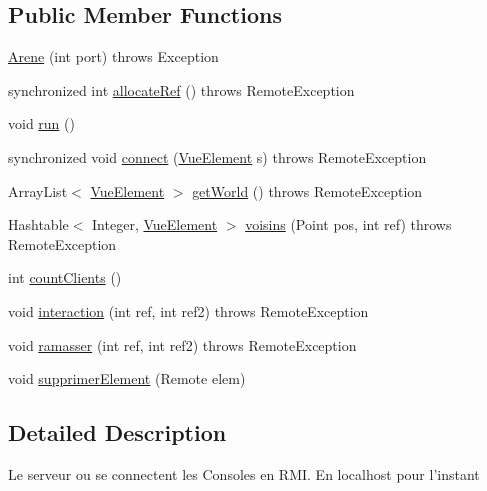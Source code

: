 \subsection*{Public Member Functions}
\begin{DoxyCompactItemize}
\item 
\hyperlink{classserveur_1_1_arene_a5431d21bfdc858dbe31c6ec6b046aaca}{Arene} (int port)  throws Exception 
\item 
synchronized int \hyperlink{classserveur_1_1_arene_a88151079f2665d1973168e0cb266e3c7}{allocate\-Ref} ()  throws Remote\-Exception 
\item 
void \hyperlink{classserveur_1_1_arene_af37bb33255b051fa9236a62507eaf0ab}{run} ()
\item 
synchronized void \hyperlink{classserveur_1_1_arene_aa0f409b1844a97c1c413f04116cf863e}{connect} (\hyperlink{classinterface_graphique_1_1_vue_element}{Vue\-Element} s)  throws Remote\-Exception 
\item 
Array\-List$<$ \hyperlink{classinterface_graphique_1_1_vue_element}{Vue\-Element} $>$ \hyperlink{classserveur_1_1_arene_a83fb30e5a71d573d180997e60ab41304}{get\-World} ()  throws Remote\-Exception 
\item 
Hashtable$<$ Integer, \hyperlink{classinterface_graphique_1_1_vue_element}{Vue\-Element} $>$ \hyperlink{classserveur_1_1_arene_a1b8ef284b2fae162ba68884bfbe0160a}{voisins} (Point pos, int ref)  throws Remote\-Exception 
\item 
int \hyperlink{classserveur_1_1_arene_ad1bdc1a3aa97354caf2cb8c7d3f1a19b}{count\-Clients} ()
\item 
void \hyperlink{classserveur_1_1_arene_ae8331f4b3d827f4c93d4b1c08a0d9399}{interaction} (int ref, int ref2)  throws Remote\-Exception 
\item 
void \hyperlink{classserveur_1_1_arene_a930bd7387f12b44bcbfdc117fbd13672}{ramasser} (int ref, int ref2)  throws Remote\-Exception 
\item 
void \hyperlink{classserveur_1_1_arene_abbe9b4c0d7f5dcd711c702dc43c542f3}{supprimer\-Element} (Remote elem)
\end{DoxyCompactItemize}


\subsection{Detailed Description}
Le serveur ou se connectent les Consoles en R\-M\-I. En localhost pour l'instant 

